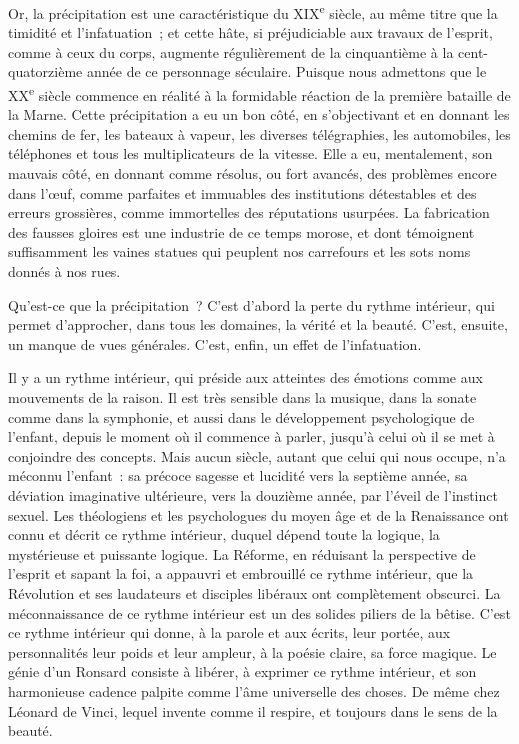 \documentclass[french,twoside]{book} %
\begin{document}
Or, la précipitation est une caractéristique du XIX\textsuperscript{e} siècle, au même titre que la timidité et l’infatuation ; et cette hâte, si préjudiciable aux travaux de l’esprit, comme à ceux du corps, augmente régulièrement de la cinquantième à la cent-quatorzième année de ce personnage séculaire. Puisque nous admettons que le XX\textsuperscript{e} siècle commence en réalité à la formidable réaction de la première bataille de la Marne. Cette précipitation a eu un bon côté, en s’objectivant et en donnant les chemins de fer, les bateaux à vapeur, les diverses télégraphies, les automobiles, les téléphones et tous les multiplicateurs de la vitesse. Elle a eu, mentalement, son mauvais côté, en donnant comme résolus, ou fort avancés, des problèmes encore dans l’œuf, comme parfaites et immuables des institutions détestables et des erreurs grossières, comme immortelles des réputations usurpées. La fabrication des fausses gloires est une industrie de ce temps morose, et dont témoignent suffisamment les vaines statues qui peuplent nos carrefours et les sots noms donnés à nos rues.\par
Qu’est-ce que la précipitation ? C’est d’abord la perte du rythme intérieur, qui permet d’approcher, dans tous les domaines, la vérité et la beauté. C’est, ensuite, un manque de vues générales. C’est, enfin, un effet de l’infatuation.\par
Il y a un rythme intérieur, qui préside aux atteintes des émotions comme aux mouvements de la raison. Il est très sensible dans la musique, dans la sonate comme dans la symphonie, et aussi dans le développement psychologique de l’enfant, depuis le moment où il commence à parler, jusqu’à celui où il se met à conjoindre des concepts. Mais aucun siècle, autant que celui qui nous occupe, n’a méconnu l’enfant : sa précoce sagesse et lucidité vers la septième année, sa déviation imaginative ultérieure, vers la douzième année, par l’éveil de l’instinct sexuel. Les théologiens et les psychologues du moyen âge et de la Renaissance ont connu et décrit ce rythme intérieur, duquel dépend toute la logique, la mystérieuse et puissante logique. La Réforme, en réduisant la perspective de l’esprit et sapant la foi, a appauvri et embrouillé ce rythme intérieur, que la Révolution et ses laudateurs et disciples libéraux ont complètement obscurci. La méconnaissance de ce rythme intérieur est un des solides piliers de la bêtise. C’est ce rythme intérieur qui donne, à la parole et aux écrits, leur portée, aux personnalités leur poids et leur ampleur, à la poésie claire, sa force magique. Le génie d’un Ronsard consiste à libérer, à exprimer ce rythme intérieur, et son harmonieuse cadence palpite comme l’âme universelle des choses. De même chez Léonard de Vinci, lequel invente comme il respire, et toujours dans le sens de la beauté.\par
\end{document}
